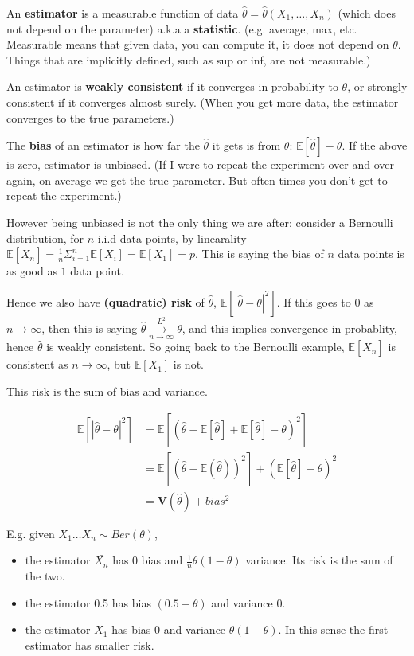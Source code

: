 \documentclass{article}
\begin{document}
An \textbf{estimator} is a measurable function of data $\hat{\theta} = \hat{\theta}(X_1, \dots, X_n)$ (which does not depend on the parameter) a.k.a a \textbf{statistic}.
(e.g. average, max, etc. Measurable means that given data, you can compute it, it does not depend on $\theta$. Things that are implicitly defined, such as sup or inf, are not measurable.)

An estimator is \textbf{weakly consistent} if it converges in probability to $\theta$, or strongly consistent if it converges almost surely.
(When you get more data, the estimator converges to the true parameters.)

The \textbf{bias} of an estimator is how far the $\hat{\theta}$ it gets is from $\theta$: $\mathbb{E}[\hat{\theta}] - \theta$.
If the above is zero, estimator is unbiased. (If I were to repeat the experiment over and over again, on average we get the true parameter. But often times you don't get to repeat the experiment.)

However being unbiased is not the only thing we are after: consider a Bernoulli distribution, for $n$ i.i.d data points, by linearality $\mathbb{E}[\bar{X_n}] = \frac{1}{n} \Sigma_{i=1}^{n}{\mathbb{E}[X_i]} = \mathbb{E}[X_1] = p$.
This is saying the bias of $n$ data points is as good as $1$ data point.

Hence we also have \textbf{(quadratic) risk} of $\hat{\theta}$, $\mathbb{E}[|\hat{\theta} - \theta|^2]$.
If this goes to $0$ as $n \to \infty$, then this is saying $\hat{\theta} \overset{L^2}{\underset{n \rightarrow \infty}{\longrightarrow}} \theta$, and this implies convergence in probablity, hence $\hat{\theta}$ is weakly consistent.
So going back to the Bernoulli example, $\mathbb{E}[\bar{X_n}]$ is consistent as $n \to \infty$, but $\mathbb{E}[X_1]$ is not.

This risk is the sum of bias and variance.

\begin{align*}
   \mathbb{E}[|\hat{\theta} - \theta|^2] &= \mathbb{E}[(\hat{\theta} - \mathbb{E}[\hat{\theta}] + \mathbb{E}[\hat{\theta}] - \theta)^2] \\
                                         &= \mathbb{E}[(\hat{\theta} - \mathbb{E}(\hat{\theta}))^2] + (\mathbb{E}[\hat{\theta}] - \theta)^2 \\
                                         &= \mathbf{V}(\hat{\theta}) + bias^2
\end{align*}

E.g. given $X_1 \dots X_n \sim Ber(\theta)$,
\begin{itemize}
  \item the estimator $\bar{X_n}$ has 0 bias and $\frac{1}{n} \theta (1 - \theta)$ variance. Its risk is the sum of the two.
  \item the estimator 0.5 has bias $(0.5 - \theta)$ and variance $0$.
  \item the estimator $X_1$ has bias 0 and variance $\theta (1 - \theta)$. In this sense the first estimator has smaller risk.
\end{itemize}
\end{document}
